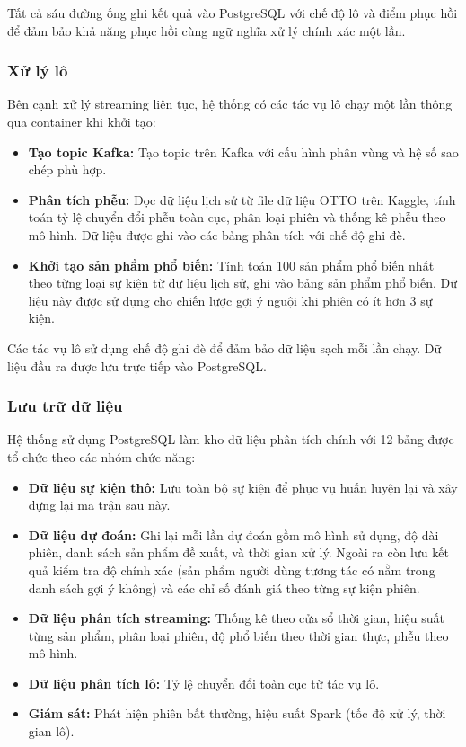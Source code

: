 \documentclass[../BTL.tex]{subfiles}
\begin{document}
Tất cả sáu đường ống ghi kết quả vào PostgreSQL với chế độ lô và điểm phục hồi để đảm bảo khả năng phục hồi cùng ngữ nghĩa xử lý chính xác một lần.

\subsubsection{Xử lý lô}
Bên cạnh xử lý streaming liên tục, hệ thống có các tác vụ lô chạy một lần thông qua container khi khởi tạo:

\begin{itemize}
    \item \textbf{Tạo topic Kafka:} Tạo topic trên Kafka với cấu hình phân vùng và hệ số sao chép phù hợp.
    \item \textbf{Phân tích phễu:} Đọc dữ liệu lịch sử từ file dữ liệu OTTO trên Kaggle, tính toán tỷ lệ chuyển đổi phễu toàn cục, phân loại phiên và thống kê phễu theo mô hình. Dữ liệu được ghi vào các bảng phân tích với chế độ ghi đè.
    \item \textbf{Khởi tạo sản phẩm phổ biến:} Tính toán 100 sản phẩm phổ biến nhất theo từng loại sự kiện từ dữ liệu lịch sử, ghi vào bảng sản phẩm phổ biến. Dữ liệu này được sử dụng cho chiến lược gợi ý nguội khi phiên có ít hơn 3 sự kiện.
\end{itemize}

Các tác vụ lô sử dụng chế độ ghi đè để đảm bảo dữ liệu sạch mỗi lần chạy. Dữ liệu đầu ra được lưu trực tiếp vào PostgreSQL.

\subsubsection{Lưu trữ dữ liệu}
Hệ thống sử dụng PostgreSQL làm kho dữ liệu phân tích chính với 12 bảng được tổ chức theo các nhóm chức năng:

\begin{itemize}
    \item \textbf{Dữ liệu sự kiện thô:} Lưu toàn bộ sự kiện để phục vụ huấn luyện lại và xây dựng lại ma trận sau này.
    \item \textbf{Dữ liệu dự đoán:} Ghi lại mỗi lần dự đoán gồm mô hình sử dụng, độ dài phiên, danh sách sản phẩm đề xuất, và thời gian xử lý. Ngoài ra còn lưu kết quả kiểm tra độ chính xác (sản phẩm người dùng tương tác có nằm trong danh sách gợi ý không) và các chỉ số đánh giá theo từng sự kiện phiên.
    \item \textbf{Dữ liệu phân tích streaming:} Thống kê theo cửa sổ thời gian, hiệu suất từng sản phẩm, phân loại phiên, độ phổ biến theo thời gian thực, phễu theo mô hình.
    \item \textbf{Dữ liệu phân tích lô:} Tỷ lệ chuyển đổi toàn cục từ tác vụ lô.
    \item \textbf{Giám sát:} Phát hiện phiên bất thường, hiệu suất Spark (tốc độ xử lý, thời gian lô).
\end{itemize}
\end{document}
